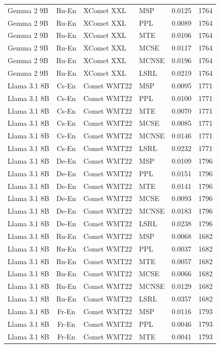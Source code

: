 \begin{table}
\begin{tabular}{lc}
Gemma 2 9B & Ru-En & XComet XXL & MSP & 0.0125 & 1764 \\
Gemma 2 9B & Ru-En & XComet XXL & PPL & 0.0089 & 1764 \\
Gemma 2 9B & Ru-En & XComet XXL & MTE & 0.0106 & 1764 \\
Gemma 2 9B & Ru-En & XComet XXL & MCSE & 0.0117 & 1764 \\
Gemma 2 9B & Ru-En & XComet XXL & MCNSE & 0.0196 & 1764 \\
Gemma 2 9B & Ru-En & XComet XXL & LSRL & 0.0219 & 1764 \\
Llama 3.1 8B & Cs-En & Comet WMT22 & MSP & 0.0095 & 1771 \\
Llama 3.1 8B & Cs-En & Comet WMT22 & PPL & 0.0100 & 1771 \\
Llama 3.1 8B & Cs-En & Comet WMT22 & MTE & 0.0070 & 1771 \\
Llama 3.1 8B & Cs-En & Comet WMT22 & MCSE & 0.0085 & 1771 \\
Llama 3.1 8B & Cs-En & Comet WMT22 & MCNSE & 0.0146 & 1771 \\
Llama 3.1 8B & Cs-En & Comet WMT22 & LSRL & 0.0232 & 1771 \\
Llama 3.1 8B & De-En & Comet WMT22 & MSP & 0.0109 & 1796 \\
Llama 3.1 8B & De-En & Comet WMT22 & PPL & 0.0151 & 1796 \\
Llama 3.1 8B & De-En & Comet WMT22 & MTE & 0.0141 & 1796 \\
Llama 3.1 8B & De-En & Comet WMT22 & MCSE & 0.0093 & 1796 \\
Llama 3.1 8B & De-En & Comet WMT22 & MCNSE & 0.0183 & 1796 \\
Llama 3.1 8B & De-En & Comet WMT22 & LSRL & 0.0238 & 1796 \\
Llama 3.1 8B & Ru-En & Comet WMT22 & MSP & 0.0068 & 1682 \\
Llama 3.1 8B & Ru-En & Comet WMT22 & PPL & 0.0037 & 1682 \\
Llama 3.1 8B & Ru-En & Comet WMT22 & MTE & 0.0057 & 1682 \\
Llama 3.1 8B & Ru-En & Comet WMT22 & MCSE & 0.0066 & 1682 \\
Llama 3.1 8B & Ru-En & Comet WMT22 & MCNSE & 0.0129 & 1682 \\
Llama 3.1 8B & Ru-En & Comet WMT22 & LSRL & 0.0357 & 1682 \\
Llama 3.1 8B & Fr-En & Comet WMT22 & MSP & 0.0116 & 1793 \\
Llama 3.1 8B & Fr-En & Comet WMT22 & PPL & 0.0046 & 1793 \\
Llama 3.1 8B & Fr-En & Comet WMT22 & MTE & 0.0041 & 1793 \\

\end{tabular}
\end{table}

